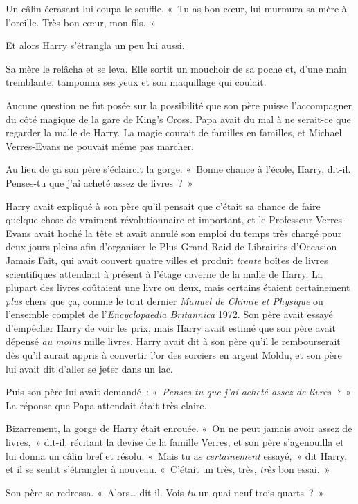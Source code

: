 Un câlin écrasant lui coupa le souffle. «~Tu as bon cœur, lui murmura sa mère à l'oreille. Très bon cœur, mon fils.~»

Et alors Harry s'étrangla un peu lui aussi.

Sa mère le relâcha et se leva. Elle sortit un mouchoir de sa poche et, d'une main tremblante, tamponna ses yeux et son maquillage qui coulait.

Aucune question ne fut posée sur la possibilité que son père puisse l'accompagner du côté magique de la gare de King's Cross. Papa avait du mal à ne serait-ce que regarder la malle de Harry. La magie courait de familles en familles, et Michael Verres-Evans ne pouvait même pas marcher.

Au lieu de ça son père s'éclaircit la gorge. «~Bonne chance à l'école, Harry, dit-il. Penses-tu que j'ai acheté assez de livres~?~»

Harry avait expliqué à son père qu'il pensait que c'était sa chance de faire quelque chose de vraiment révolutionnaire et important, et le Professeur Verres-Evans avait hoché la tête et avait annulé son emploi du temps très chargé pour deux jours pleins afin d'organiser le Plus Grand Raid de Librairies d'Occasion Jamais Fait, qui avait couvert quatre villes et produit \emph{trente} boîtes de livres scientifiques attendant à présent à l'étage caverne de la malle de Harry. La plupart des livres coûtaient une livre ou deux, mais certains étaient certainement \emph{plus} chers que ça, comme le tout dernier \emph{Manuel de Chimie et Physique} ou l'ensemble complet de l'\emph{Encyclopaedia Britannica} 1972. Son père avait essayé d'empêcher Harry de voir les prix, mais Harry avait estimé que son père avait dépensé \emph{au moins} mille livres. Harry avait dit à son père qu'il le rembourserait dès qu'il aurait appris à convertir l'or des sorciers en argent Moldu, et son père lui avait dit d'aller se jeter dans un lac.

Puis son père lui avait demandé~: «~\emph{Penses-tu que j'ai acheté assez de livres~?}~» La réponse que Papa attendait était très claire.

Bizarrement, la gorge de Harry était enrouée. «~On ne peut jamais avoir assez de livres,~» dit-il, récitant la devise de la famille Verres, et son père s'agenouilla et lui donna un câlin bref et résolu. «~Mais tu as \emph{certainement} essayé,~» dit Harry, et il se sentit s'étrangler à nouveau. «~C'était un très, très, \emph{très} bon essai.~»

Son père se redressa. «~Alors… dit-il. Vois-\emph{tu} un quai neuf trois-quarts~?~»

